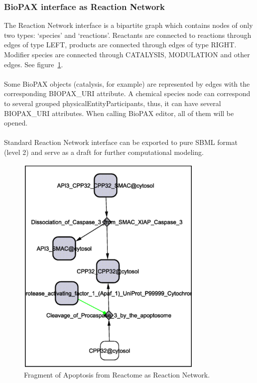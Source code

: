\subsubsection{BioPAX interface as Reaction Network}
The Reaction Network interface is a bipartite graph which contains nodes of only two types: ‘species’ and ‘reactions’. Reactants are connected to reactions through edges of type LEFT, products are connected through edges of type RIGHT. Modifier species are connected through CATALYSIS, MODULATION and other edges. See figure~\ref{BioPAX_reaction_network}.\\\\
Some BioPAX objects (catalysis, for example) are represented by edges with the corresponding BIOPAX\_URI attribute.
A chemical species node can correspond to several grouped physicalEntityParticipants, thus, it can have several BIOPAX\_URI attributes. When calling BioPAX editor, all of them will be opened.\\\\
Standard Reaction Network interface can be exported to pure SBML format (level 2) and serve as a draft for further computational modeling.
\begin{figure}
\centering
\includegraphics[width=0.8\textwidth]{graphics/BioPAX_reaction_network}
\caption{Fragment of Apoptosis from Reactome as Reaction Network.}
\label{BioPAX_reaction_network}
\end{figure}
